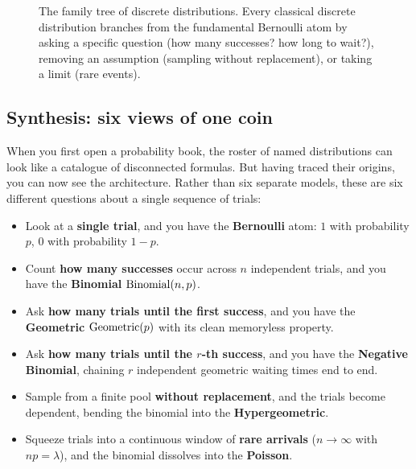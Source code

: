 \begin{figure}[H]
\caption{The family tree of discrete distributions. Every classical discrete distribution branches from the fundamental Bernoulli atom by asking a specific question (how many successes? how long to wait?), removing an assumption (sampling without replacement), or taking a limit (rare events).}
\label{ch07:fig-family-tree}
\end{figure}

\subsection{Synthesis: six views of one coin}
\label{ch07:synthesis}

When you first open a probability book, the roster of named distributions can look
like a catalogue of disconnected formulas. But having traced their origins, you can
now see the architecture. Rather than six separate models, these are six
different questions about a single sequence of trials:

\begin{itemize}
\item Look at a \textbf{single trial}, and you have the \textbf{Bernoulli} atom: $1$ with probability $p$, $0$ with probability $1-p$.
\item Count \textbf{how many successes} occur across $n$ independent trials, and you have the \textbf{Binomial} $\operatorname{Binomial}(n,p)$.
\item Ask \textbf{how many trials until the first success}, and you have the \textbf{Geometric} $\operatorname{Geometric}(p)$ with its clean memoryless property.
\item Ask \textbf{how many trials until the $r$-th success}, and you have the \textbf{Negative Binomial}, chaining $r$ independent geometric waiting times end to end.
\item Sample from a finite pool \textbf{without replacement}, and the trials become dependent, bending the binomial into the \textbf{Hypergeometric}.
\item Squeeze trials into a continuous window of \textbf{rare arrivals} ($n \to \infty$ with $np = \lambda$), and the binomial dissolves into the \textbf{Poisson}.
\end{itemize}

